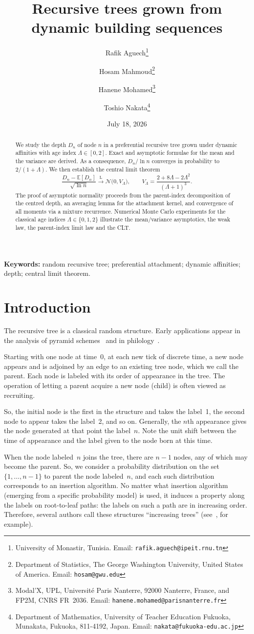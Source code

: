 \documentclass[11pt]{article}
\title{Recursive trees grown from dynamic building sequences}
\author{
Rafik Aguech\footnote{University of Monastir, Tunisia.
  Email: \texttt{rafik.aguech@ipeit.rnu.tn}}
\and
Hosam Mahmoud\footnote{Department of Statistics, The George Washington University,
  United States of America. Email: \texttt{hosam@gwu.edu}}
\and
Hanene Mohamed\footnote{Modal'X, UPL, Universit\'e Paris Nanterre, 92000 Nanterre, France,
  and FP2M, CNRS FR~2036. Email: \texttt{hanene.mohamed@parisnanterre.fr}}
\and
Toshio Nakata\footnote{Department of Mathematics, University of Teacher Education Fukuoka,
  Munakata, Fukuoka, 811-4192, Japan. Email: \texttt{nakata@fukuoka-edu.ac.jp}}
}
\date{July 18, 2026}
\theoremstyle{remark}
\newcommand{\E}{\mathbb{E}}
\newcommand{\llaw}{\xrightarrow{\mathrm{L}}}
\begin{document}
\maketitle

\begin{abstract}
We study the depth \(D_n\) of node \(n\) in a preferential recursive tree grown
under dynamic affinities with age index \(\Lambda\in[0,2]\). Exact and asymptotic
formulae for the mean and the variance are derived. As a consequence,
\(D_n/\ln n\) converges in probability to \(2/(1+\Lambda)\). We then establish the
central limit theorem
\[
\frac{D_n-\E[D_n]}{\sqrt{\ln n}}
\llaw
\mathcal{N}\bigl(0,V_\Lambda\bigr),
\qquad
V_\Lambda=\frac{2+8\Lambda-2\Lambda^2}{(\Lambda+1)^3}.
\]
The proof of asymptotic normality proceeds from the parent-index decomposition of
the centred depth, an averaging lemma for the attachment kernel, and convergence
of all moments via a mixture recurrence. Numerical Monte Carlo experiments for
the classical age indices \(\Lambda\in\{0,1,2\}\) illustrate the mean/variance
asymptotics, the weak law, the parent-index limit law and the CLT.
\end{abstract}

\noindent\textbf{Keywords:} random recursive tree; preferential attachment;
dynamic affinities; depth; central limit theorem.

\section{Introduction}

The recursive tree is a classical random structure. Early applications appear
in the analysis of pyramid schemes~\citep{gastwirth1984} and in
philology~\citep{najock1982}.

Starting with one node at time~0, at each new tick of discrete time, a new node
appears and is adjoined by an edge to an existing tree node, which we call the
parent. Each node is labeled with its order of appearance in the tree. The
operation of letting a parent acquire a new node (child) is often viewed as
recruiting.

So, the initial node is the first in the structure and takes the label~1, the
second node to appear takes the label~2, and so on. Generally, the \(n\)th
appearance gives the node generated at that point the label~$n$. Note the unit
shift between the time of appearance and the label given to the node born at
this time.

When the node labeled~$n$ joins the tree, there are \(n-1\) nodes, any of which
may become the parent. So, we consider a probability distribution on the set
\(\{1,\ldots,n-1\}\) to parent the node labeled~$n$, and each such distribution
corresponds to an insertion algorithm. No matter what insertion algorithm
(emerging from a specific probability model) is used, it induces a property along
the labels on root-to-leaf paths: the labels on such a path are in increasing
order. Therefore, several authors call these structures ``increasing trees''
(see~\cite{bergeron1992}, for example).
\end{document}
